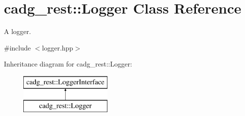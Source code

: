 \hypertarget{classcadg__rest_1_1_logger}{}\section{cadg\+\_\+rest\+::Logger Class Reference}
\label{classcadg__rest_1_1_logger}


A logger.  




{\ttfamily \#include $<$logger.\+hpp$>$}

Inheritance diagram for cadg\+\_\+rest\+::Logger\+:\begin{figure}[H]
\begin{center}
\leavevmode
\includegraphics[height=2.000000cm]{classcadg__rest_1_1_logger}
\end{center}
\end{figure}
